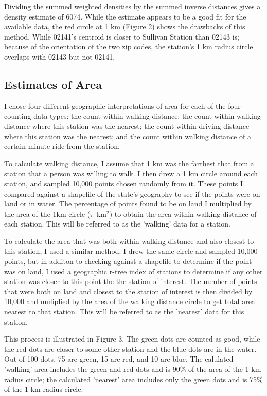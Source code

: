 \documentclass{article}
\begin{document}
Dividing the summed weighted densities by the summed inverse distances gives a density estimate of 6074. While the estimate appears to be a good fit for the available data, the red circle at 1 km (Figure 2) shows the drawbacks of this method. While 02141's centroid is closer to Sullivan Station than 02143 is; because of the orientation of the two zip codes, the station's 1 km radius circle overlaps with 02143 but not 02141. 

\subsection{Estimates of Area}

I chose four different geographic interpretations of area for each of the four counting data types: the count within walking distance; the count within walking distance where this station was the nearest; the count within driving distance where this station was the nearest; and the count within walking distance of a certain minute ride from the station. 

To calculate walking distance, I assume that 1 km was the farthest that from a station that a person was willing to walk. I then drew a 1 km circle around each station, and sampled 10,000 points chosen randomly from it. These points I compared against a shapefile of the state's geography to see if the points were on land or in water. The percentage of points found to be on land I multiplied by the area of the 1km circle ($\pi$ km$^2$) to obtain the area within walking distance of each station. This will be referred to as the 'walking' data for a station.

To calculate the area that was both within walking distance and also closest to this station, I used a similar method. I drew the same circle and sampled 10,000 points, but in additon to checking against a shapefile to determine if the point was on land, I used a geographic r-tree index of stations to determine if any other station was closer to this point the the station of interest. The number of points that were both on land and closest to the station of interest is then divided by 10,000 and muliplied by the area of the walking distance circle to get total area nearest to that station. This will be referred to as the 'nearest' data for this station.

This process is illustrated in Figure 3. The green dots are counted as good, while the red dots are closer to some other station and the blue dots are in the water. Out of 100 dots, 75 are green, 15 are red, and 10 are blue. The calulated 'walking' area includes the green and red dots and is 90\% of the area of the 1 km radius circle; the calculated 'nearest' area includes only the green dots and is 75\% of the 1 km radius circle. 
\end{document}
